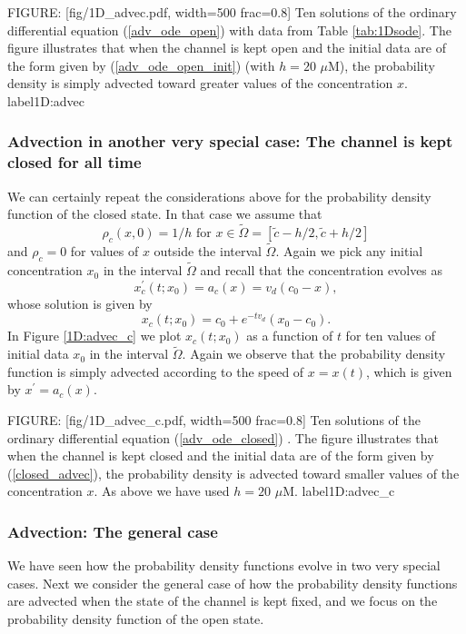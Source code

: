 FIGURE: [fig/1D_advec.pdf, width=500 frac=0.8] Ten solutions of the ordinary differential equation (\ref{adv_ode_open}) with data from Table \ref{tab:1Dsode}. The figure illustrates that when the channel is kept open and the initial data are of the form given by (\ref{adv_ode_open_init}) (with $h=20$ $\mu$M), the probability density is simply advected toward greater values of the concentration $x$.  label{1D:advec}
\subsubsection{Advection in another very special case: The channel is kept closed for all time}

We can certainly repeat the considerations above for the probability density function of the closed state. In that case we assume that
\begin{equation}
 \rho_c (x,0)=1/h \text{ for } x\in \tilde{\Omega} = [\tilde{c}-h/2,\tilde{c}+h/2 ]  \label{closed_advec}
  \end{equation}
and $\rho_c=0$ for values of $x$ outside the interval $\tilde{\Omega}$. Again we pick any initial concentration $x_0$ in the interval
$\tilde{\Omega}$ and recall that the concentration evolves as
\begin{equation}
x^{\prime}_c(t;x_0)=a_c(x)=v_{d}\left(c_{0}-x\right), \label{adv_ode_closed}
\end{equation}
whose solution is given by 
\[
x_c(t;x_0)=c_{0}+e^{-t v_{d}}\left(  x_{0}-c_{0}\right).
\]
In Figure \ref{1D:advec_c} we plot $x_c(t;x_0)$ as a function of $t$ for ten values of initial data $x_0$ in the interval $\tilde{\Omega}$. Again we observe that the probability density function is simply advected according to 
 the speed of $x=x(t)$, which is given by $x^{\prime}=a_c(x)$.

FIGURE: [fig/1D_advec_c.pdf, width=500 frac=0.8] Ten solutions of the ordinary differential equation (\ref{adv_ode_closed}) . The figure illustrates that when the channel is kept closed and the initial data are of the form given by (\ref{closed_advec}), the probability density is advected toward smaller values of the concentration $x$. As above we have used $h=20$ $\mu$M. label{1D:advec_c}\subsubsection{Advection: The general case}

We have seen how the probability density functions evolve in two very special cases. Next we consider the general case of how the probability density functions are advected when the state of the channel is kept fixed, and we focus on the probability density function of the open state.

